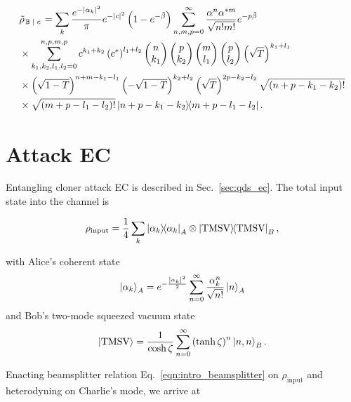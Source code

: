 \begin{align}\label{eqn:appendix_bs1_state}
%
&\tilde{\rho}_{\left. \mathbb{B} \given c\right.} = \sum_k \frac{e^{- \left|\alpha_k\right|^2}}{\pi} e^{-\left|c\right|^2} \left( 1 - e^{- \tilde{\beta}}\right) \sum_{n, m, p = 0}^\infty \frac{\alpha^n \alpha^{* m}}{\sqrt{n! m!}} e^{- p \tilde{\beta}}  \notag \\
%
&\times \sum_{k_1, k_2, l_1, l_2=0}^{n, p, m, p} c^{k_1 + k_2} \left(c^*\right)^{l_1 + l_2} \pmqty{n \\ k_1} \pmqty{ p \\ k_2} \pmqty{ m \\ l_1 } \pmqty{p \\ l_2} \left( \sqrt{T} \right)^{k_1 + l_1} \notag \\
%
&\times \left(\sqrt{1-T}\right)^{n + m - k_1 - l_1} \left( - \sqrt{1-T}\right)^{k_2 + l_2} \left( \sqrt{T} \right)^{2 p - k_2 - l_2}\sqrt{\left(n + p - k_1 - k_2\right)!}  \notag \\
%
&\times\sqrt{\left(m + p - l_1 - l_2 \right)!} \dyad{n + p - k_1 - k_2}{m + p - l_1 - l_2}.
%
\end{align}

\section{Attack EC}\label{appendix:ec_state}
Entangling cloner attack EC is described in Sec.~\ref{sec:qds_ec}. The total input state into the channel is

\begin{equation}
\rho_{\text{input}} = \frac{1}{4}\sum_k \dyad{\alpha_k}_A \otimes \dyad{\text{TMSV}}_B,
\end{equation}

\noindent with Alice's coherent state
\begin{equation}
\ket{\alpha_k}_A = e^{- \frac{\left| \alpha_k \right|^2}{2}} \sum_{n=0}^\infty \frac{\alpha_k^n}{\sqrt{n!}} \ket{n}_A
\end{equation}
and Bob's two-mode squeezed vacuum state
\begin{equation}
\ket{\text{TMSV}} = \frac{1}{\cosh{\zeta}}\sum_{n=0}^\infty \left(\tanh{\zeta}\right)^n \ket{n, n}_B.
\end{equation}

\noindent Enacting beamsplitter relation Eq.~\ref{eqn:intro_beamsplitter} on $\rho_{\text{input}}$ and heterodyning on Charlie's mode, we arrive at %

